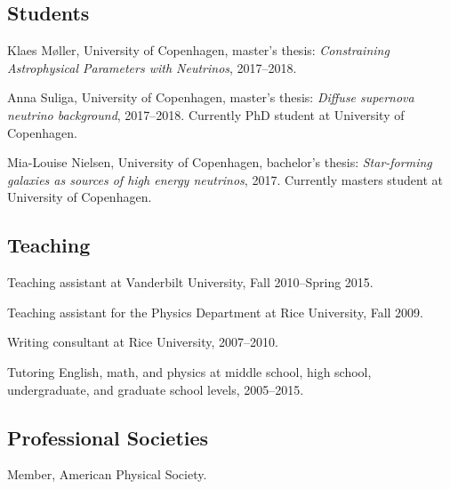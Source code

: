\documentclass{article}
\renewenvironment{itemize}{
\begin{list}{}{
\setlength{\leftmargin}{.5em}}}{
\end{list}}
\begin{document}
\subsection*{Students}
\begin{itemize}
\item Klaes M\o ller, University of Copenhagen, master's thesis: \emph{Constraining Astrophysical Parameters with Neutrinos}, 2017--2018.
\item Anna Suliga, University of Copenhagen, master's thesis: \emph{Diffuse supernova neutrino background}, 2017--2018.
Currently PhD student at University of Copenhagen.
\item Mia-Louise Nielsen, University of Copenhagen, bachelor's thesis: \emph{Star-forming galaxies as sources of high energy neutrinos}, 2017.
Currently masters student at University of Copenhagen.
\end{itemize}

\subsection*{Teaching}
\begin{itemize}
\item Teaching assistant at Vanderbilt University, Fall 2010--Spring 2015.
\item Teaching assistant for the Physics Department at Rice University, Fall 2009.
\item Writing consultant at Rice University, 2007--2010.
\item Tutoring English, math, and physics at middle school, high school, undergraduate, and graduate school levels, 2005--2015.
\end{itemize}

\subsection*{Professional Societies}
\begin{itemize}
\item Member, American Physical Society.
\end{itemize}
\end{document}
